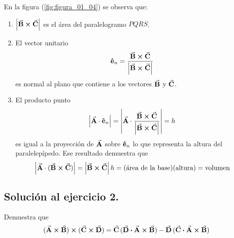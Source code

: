 \documentclass[hidelinks,12pt]{article}
\begin{document}
En la figura (\ref{fig:figura_01_04}) se observa que:
\begin{enumerate}[label=\roman*)]
    \item $\abs{\va{B} \cross \va{C}}$ es el área del paralelogramo $PQRS$.
    \item El vector unitario
    \begin{align*}
        \vu{e}_{n} = \dfrac{\va{B} \cross \va{C}}{\abs{\va{B} \cross \va{C}}}
    \end{align*}
    es normal al plano que contiene a los vectores $\va{B}$ y $\va{C}$.
    \item El producto punto
    \begin{align*}
        \abs{\va{A} \cdot \vu{e}_{n}} = \abs{\va{A} \cdot \dfrac{\va{B} \cross \va{C}}{\abs{\va{B} \cross \va{C}}}} = h
    \end{align*}
    es igual a la proyección de $\va{A}$ sobre $\vu{e}_{n}$ lo que representa la altura del paralelepípedo. Ese resultado demuestra que
    \begin{align*}
        \abs{\va{A} \cdot (\va{B} \cross \va{C})} = \abs{\va{B} \cross \va{C}} \, h = (\text{área de la base})(\text{altura}) = \text{volumen}
    \end{align*}
\end{enumerate}

\subsection*{Solución al ejercicio 2.}

Demuestra que
\begin{align*}
    (\va{A} \cross \va{B}) \cross (\va{C} \cross \va{D}) = \va{C} \, ( \va{D} \vdot \va{A} \cross \va{B}) - \va{D} \, (\va{C} \vdot \va{A} \cross \va{B})
\end{align*}
\end{document}
